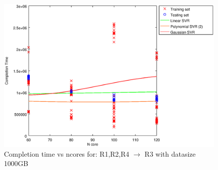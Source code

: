 
\begin {figure}[hbtp]
\centering
\includegraphics[width=\textwidth]{output/R1,R2,R4_R3_1000_ALL_FEATURES/plot_R1,R2,R4_R3_1000_bestmodels.eps}
\caption{Completion time vs ncores for: R1,R2,R4 $\rightarrow$ R3 with datasize 1000GB}
\label{fig:coreonly_linear_R1,R2,R4_R3_1000}
\end {figure}
